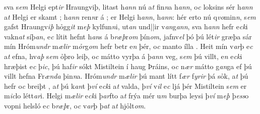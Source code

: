 sva s\textit{em} Helgi ept\textit{ir} Hraungviþ, litast h\textit{ann} nú   a\textit{t} fin\textit{n}a h\textit{ann}, o\textit{c} loksins sér  h\textit{ann} 
a\textit{t} Helgi er skamt   ; 
h\textit{ann} ren\textit{n}r   á  ; er Helgi   h\textit{ann},   h\textit{ann}: hér erto nú q\textit{vo}min\textit{n}, 
s\textit{em} gafst Hraungv\textit{iþ}  hỏgg\textit{it} m\textit{eþ} kylfun\textit{n}i, ut\textit{an} und||ir v\textit{an}g\textit{an}\textit{n}, 
sva h\textit{ann} hefr
e\textit{ck}i vakn\textit{at} síþ\textit{an},   e\textit{c} lítit hefnt h\textit{an}s á
b\textit{ræþ}r\textit{om} þín\textit{om}, jafnv\textit{el} þó þú
lét\textit{ir} græþa sár mín  Hróm\textit{undr} m\textit{ælir}
m\textit{ỏr}g\textit{om} hefr betr   e\textit{n} þér, o\textit{c} manto ílla   . 
Heit mín v\textit{ar}þ e\textit{c} a\textit{t} efna,   hv\textit{aþ} s\textit{em} ỏþro leiþ, o\textit{c} mátto vyrþa á
þ\textit{ann} veg, s\textit{em} þú villt,  e\textit{n}
e\textit{ck}i hræþist e\textit{c} þ\textit{ic},   þú haf\textit{ir} sókt Mistiltein í  haug Þráins, o\textit{c}
n\textit{ær} mátto g\textit{an}ga ef þú villt hefna 
Fr\textit{ænda} þin\textit{n}a. Hróm\textit{undr} m\textit{ælir} þú mant
lítt   f\textit{ær} f\textit{yrir} þá sỏk,  a\textit{t} þú hefr   o\textit{c} breiþt  , a\textit{t} þú k\textit{an}t  þ\textit{ví} e\textit{ck}i
a\textit{t} valda,    þ\textit{ví} v\textit{il} e\textit{c} ljá þér Mistiltein s\textit{em} er
m\textit{ic}lo  létt\textit{ar}i. Helgi m\textit{ælir}
e\textit{ck}i þ\textit{ar}fto a\textit{t} frýa mér u\textit{m} burþa leysi
þ\textit{ví} m\textit{eþ} þ\textit{ess}o   vopni helsló e\textit{c}  b\textit{ræþ}r, o\textit{c} v\textit{ar}þ þ\textit{at}  a\textit{t} hjỏlt\textit{om}. 
